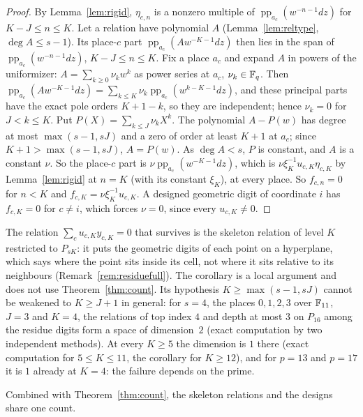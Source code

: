 \begin{proof}
By Lemma~\ref{lem:rigid}, $\eta_{c,n}$ is a nonzero multiple of $\operatorname{pp}_{a_c}(w^{-n-1}dz)$ for $K-J\le n\le K$. Let a relation have polynomial $A$ (Lemma~\ref{lem:reltype}, $\deg A\le s-1$). Its place-$c$ part $\operatorname{pp}_{a_c}(Aw^{-K-1}dz)$ then lies in the span of $\operatorname{pp}_{a_c}(w^{-n-1}dz)$, $K-J\le n\le K$. Fix a place $a_c$ and expand $A$ in powers of the uniformizer: $A=\sum_{k\ge0}\nu_kw^k$ as power series at $a_c$, $\nu_k\in\mathbb{F}_q$. Then $\operatorname{pp}_{a_c}(Aw^{-K-1}dz)=\sum_{k\le K}\nu_k\operatorname{pp}_{a_c}(w^{k-K-1}dz)$, and these principal parts have the exact pole orders $K+1-k$, so they are independent; hence $\nu_k=0$ for $J<k\le K$. Put $P(X)=\sum_{k\le J}\nu_kX^k$. The polynomial $A-P(w)$ has degree at most $\max(s-1,sJ)$ and a zero of order at least $K+1$ at $a_c$; since $K+1>\max(s-1,sJ)$, $A=P(w)$. As $\deg A<s$, $P$ is constant, and $A$ is a constant $\nu$. So the place-$c$ part is $\nu\operatorname{pp}_{a_c}(w^{-K-1}dz)$, which is $\nu\xi_K^{-1}u_{c,K}\eta_{c,K}$ by Lemma~\ref{lem:rigid} at $n=K$ (with its constant $\xi_K$), at every place. So $f_{c,n}=0$ for $n<K$ and $f_{c,K}=\nu\xi_K^{-1}u_{c,K}$. A designed geometric digit of coordinate $i$ has $f_{c,K}=0$ for $c\ne i$, which forces $\nu=0$, since every $u_{c,K}\ne0$.
\end{proof}

The relation $\sum_cu_{c,K}y_{c,K}=0$ that survives is the skeleton relation of level $K$ restricted to $P_{sK}$: it puts the geometric digits of each point on a hyperplane, which says where the point sits inside its cell, not where it sits relative to its neighbours (Remark~\ref{rem:residuefull}). The corollary is a local argument and does not use Theorem~\ref{thm:count}. Its hypothesis $K\ge\max(s-1,sJ)$ cannot be weakened to $K\ge J+1$ in general: for $s=4$, the places $0,1,2,3$ over $\mathbb{F}_{11}$, $J=3$ and $K=4$, the relations of top index $4$ and depth at most $3$ on $P_{16}$ among the residue digits form a space of dimension~$2$ (exact computation by two independent methods). At every $K\ge5$ the dimension is $1$ there (exact computation for $5\le K\le11$, the corollary for $K\ge12$), and for $p=13$ and $p=17$ it is $1$ already at $K=4$: the failure depends on the prime.

Combined with Theorem~\ref{thm:count}, the skeleton relations and the designs share one count.

